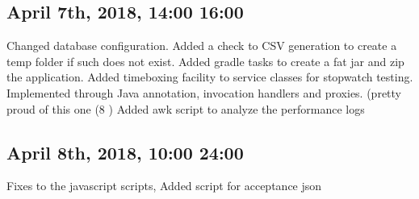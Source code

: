 \documentclass[12pt]{article}
\begin{document}
\subsection*{April 7th,  2018, 14:00 16:00}
 Changed database configuration. Added a check to CSV generation to create a temp folder if such does not exist. Added gradle tasks to create a fat jar and zip the application.
 Added timeboxing facility to service classes for stopwatch testing. Implemented through Java annotation, invocation handlers and proxies. (pretty proud of this one (8 )
  Added awk script to analyze the performance logs 
  
\subsection*{April 8th,  2018, 10:00 24:00}
 Fixes to the javascript scripts,  Added script for acceptance json 
\end{document}
